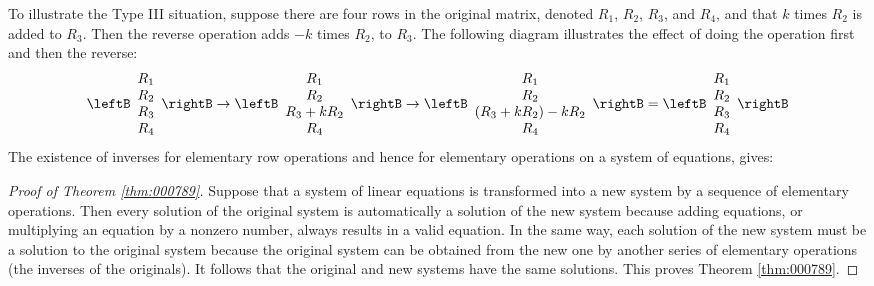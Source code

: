 To illustrate the Type III situation, suppose there are four rows in the original matrix, denoted $R_1$, $R_2$, $R_3$, and $R_4$, and that $k$ times $R_2$ is added to $R_3$. Then the reverse operation adds $-k$ times $R_2$, to $R_3$. The following diagram illustrates the effect of doing the operation first and then the reverse:
\begin{equation*}
\leftB \begin{array}{c}
	R_1 \\
	R_2 \\
	R_3 \\
	R_4
\end{array} \rightB
\rightarrow
\leftB \begin{array}{c}
R_1 \\
R_2 \\
R_3 + kR_2\\
R_4
\end{array} \rightB
\rightarrow
\leftB \begin{array}{c}
R_1 \\
R_2 \\
(R_3 + kR_2) - kR_2\\
R_4
\end{array} \rightB
=
\leftB \begin{array}{c}
R_1 \\
R_2 \\
R_3 \\
R_4
\end{array} \rightB
\end{equation*}
The existence of inverses for elementary row operations and hence for elementary operations on a system of equations, gives:

\begin{proof}[Proof of Theorem \ref{thm:000789}]
Suppose that a system of linear equations is transformed into a new system by a sequence of elementary operations. Then every solution of the original system is automatically a solution of the new system because adding equations, or multiplying an equation by a nonzero number, always results in a valid equation. In the same way, each solution of the new system must be a solution to the original system because the original system can be obtained from the new one by another series of elementary operations (the inverses of the originals). It follows that the original and new systems have the same solutions. This proves Theorem \ref{thm:000789}.
\end{proof}

